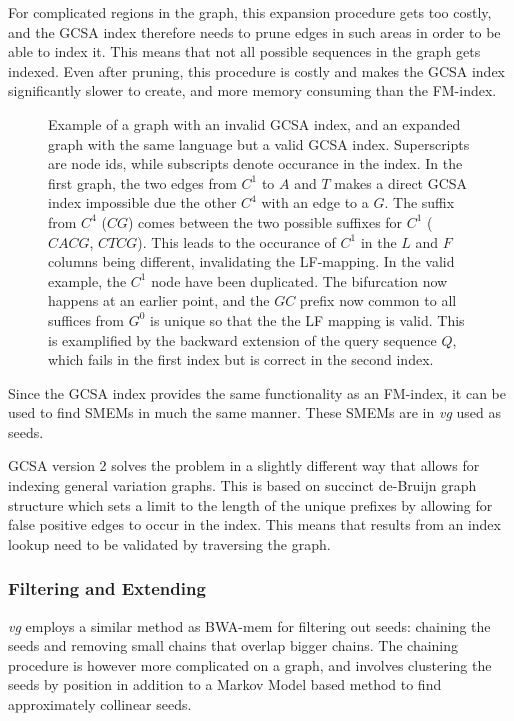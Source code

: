 For complicated regions in the graph, this expansion procedure gets too costly, and the GCSA index therefore needs to prune edges in such areas in order to be able to index it.
This means that not all possible sequences in the graph gets indexed. 
Even after pruning, this procedure is costly and makes the GCSA index significantly slower to create, and more memory consuming than the FM-index.

\begin{figure}
  \tikzpicture
  
  \endtikzpicture
  \caption{
    Example of a graph with an invalid GCSA index, and an expanded graph with the same language but a valid GCSA index. Superscripts are node ids, while subscripts denote occurance in the index. 
    In the first graph, the two edges from $C^1$ to $A$ and $T$ makes a direct GCSA index impossible due the other $C^4$ with an edge to a $G$. The suffix from $C^4$ ($CG$) comes between the two possible suffixes for $C^1$ ($CACG$, $CTCG$). This leads to the occurance of $C^1$ in the $L$ and $F$ columns being different, invalidating the LF-mapping.
    In the valid example, the $C^1$ node have been duplicated. The bifurcation now happens at an earlier point, and the $GC$ prefix now common to all suffices from $G^0$ is unique so that the the LF mapping is valid. This is examplified by the backward extension of the query sequence $Q$, which fails in the first index but is correct in the second index.
}
    \label{fig:gcsa}
\end{figure}

Since the GCSA index provides the same functionality as an FM-index, it can be used to find SMEMs in much the same manner. These SMEMs are in \emph{vg} used as seeds. 

GCSA version 2 solves the problem in a slightly different way that allows for indexing general variation graphs.
This is based on succinct de-Bruijn graph~\cite{succinctdebruijn} structure which sets a limit to the length of the unique prefixes by allowing for false positive edges to occur in the index.
This means that results from an index lookup need to be validated by traversing the graph. 

\subsubsection{Filtering and Extending}
\emph{vg} employs a similar method as BWA-mem for filtering out seeds: chaining the seeds and removing small chains that overlap bigger chains.
The chaining procedure is however more complicated on a graph, and involves clustering the seeds by position in addition to a Markov Model based method to find approximately collinear seeds. 

